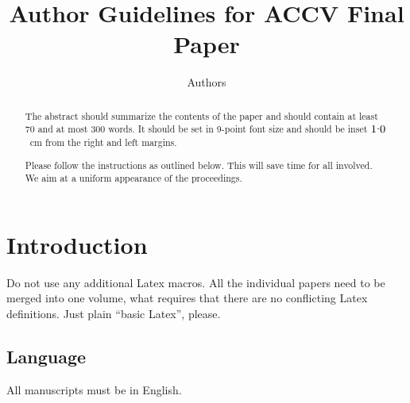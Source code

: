 \documentclass[runningheads]{llncs}
\begin{document}
\newcommand{\point}{
    \raise0.7ex\hbox{.}
    }
    
    
\pagestyle{headings}

\mainmatter

\title{Author Guidelines for ACCV Final Paper} %



\author{Authors} %

\maketitle

\begin{abstract}
The abstract should summarize the contents of the paper and should
contain at least 70 and at most 300 words. It should be set in 9-point
font size and should be inset $1\point0$~cm from the right and left margins.

Please follow the instructions as outlined below. This will save time for all involved.
We aim at a uniform appearance of the proceedings.
\end{abstract}

\section{Introduction}

Do not use any additional Latex macros. All the individual papers need to be
merged into one volume, what requires that there are no conflicting Latex definitions.
Just plain ``basic Latex'', please.

\subsection{Language}

All manuscripts must be in English.
\end{document}
